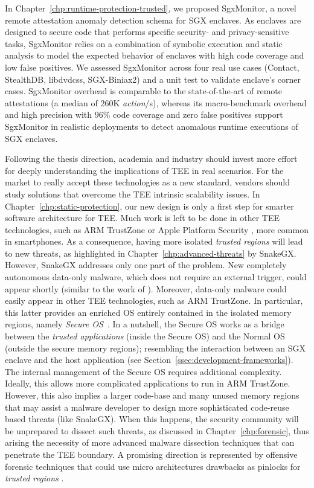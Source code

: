 In Chapter~\ref{chp:runtime-protection-trusted}, we proposed SgxMonitor, a 
novel remote attestation anomaly detection schema for SGX enclaves. As enclaves 
are designed to secure code that performs specific security- and 
privacy-sensitive tasks, SgxMonitor relies on a combination of symbolic 
execution and static analysis to model the expected behavior of enclaves with 
high code coverage and low false positives.  
We assessed SgxMonitor across four real use cases (\ie \textsf{Contact}, 
\textsf{StealthDB}, \textsf{libdvdcss}, \textsf{SGX-Biniax2}) and a 
\textsf{unit test} to validate enclave's corner cases. SgxMonitor overhead is 
comparable to the state-of-the-art of remote attestations (a median of $260$K
\emph{action}/s), whereas its macro-benchmark overhead and high precision
with $96$\% code coverage and zero false positives support SgxMonitor in 
realistic deployments to detect anomalous runtime executions of SGX enclaves.

\vspace{0.3cm}
Following the thesis direction, academia and industry should invest more 
effort for deeply understanding the implications of TEE in real scenarios.
For the market to really accept these technologies as a new standard, vendors 
should study solutions that overcome the TEE intrinsic scalability issues. 
In Chapter~\ref{chp:static-protection}, our new design is only a first step for 
smarter software architecture for TEE.
Much work is left to be done in other TEE technologies, such as ARM TrustZone 
\citep{arm-trustzone} or Apple Platform Security \citep{apple-enclave}, more 
common in smartphones.
As a consequence, having more isolated \emph{trusted regions} will lead to new 
threats, as highlighted in Chapter~\ref{chp:advanced-threats} by SnakeGX.
However, SnakeGX addresses only one part of the problem. 
New completely autonomous data-only malware, which does not require an external 
trigger, could appear shortly (similar to the work of 
\cite{vogl2014persistent}).
Moreover, data-only malware could easily appear in other TEE technologies, such 
as ARM TrustZone. In particular, this latter provides an enriched OS entirely 
contained in the isolated memory 
regions, namely \emph{Secure OS}~\citep{ngabonziza_trustzone_2016}.
In a nutshell, the Secure OS works as a bridge between the \emph{trusted 
applications} (inside the Secure OS) and the Normal OS (outside the secure 
memory regions); resembling the interaction between an SGX enclave and the host 
application (see Section~\ref{ssec:development-frameworks}).
The internal management of the Secure OS requires additional complexity. 
Ideally, this allows more complicated applications to run in ARM TrustZone. 
However, this also implies a larger code-base and many unused memory regions 
that may assist a malware developer to design more sophisticated code-reuse 
based threats (like SnakeGX).
When this happens, the security community will be unprepared to dissect such 
threats, as discussed in Chapter~\ref{chp:forensic}, thus arising the necessity 
of more advanced malware dissection techniques that
can penetrate the TEE boundary. A promising direction is represented by 
offensive forensic techniques that could use micro 
architectures drawbacks as pinlocks for \emph{trusted regions} 
\citep{offensiveforensic}.

